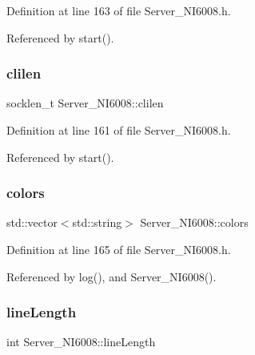 Definition at line 163 of file Server\+\_\+\+N\+I6008.\+h.



Referenced by start().

\mbox{\label{classServer__NI6008_a7870880eba646269208e0c75de3e63bc}} 
\subsubsection{\texorpdfstring{clilen}{clilen}}
{\footnotesize\ttfamily socklen\+\_\+t Server\+\_\+\+N\+I6008\+::clilen\hspace{0.3cm}{\ttfamily [private]}}



Definition at line 161 of file Server\+\_\+\+N\+I6008.\+h.



Referenced by start().

\mbox{\label{classServer__NI6008_a79fecc3f96756f6a519785663bb11d07}} 
\subsubsection{\texorpdfstring{colors}{colors}}
{\footnotesize\ttfamily std\+::vector$<$std\+::string$>$ Server\+\_\+\+N\+I6008\+::colors\hspace{0.3cm}{\ttfamily [private]}}



Definition at line 165 of file Server\+\_\+\+N\+I6008.\+h.



Referenced by log(), and Server\+\_\+\+N\+I6008().

\mbox{\label{classServer__NI6008_a88ff64de4d8715d849b06c2457d13e17}} 
\subsubsection{\texorpdfstring{line\+Length}{lineLength}}
{\footnotesize\ttfamily int Server\+\_\+\+N\+I6008\+::line\+Length\hspace{0.3cm}{\ttfamily [private]}}



